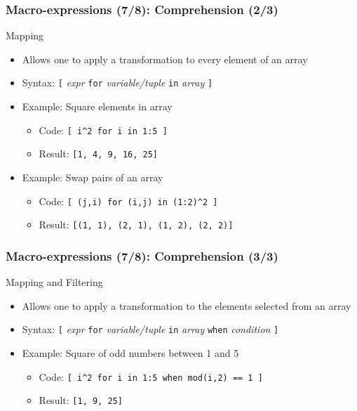 \documentclass[aspectratio=169]{beamer}
\begin{document}
\begin{frame}[fragile=singleslide]
  \frametitle{Macro-expressions (7/8): Comprehension (2/3)}
  \begin{block}{Mapping}
    \begin{itemize}
    \item Allows one to apply a transformation to every element of an array
    \item Syntax: \texttt{[} \textit{expr} \texttt{for} \textit{variable/tuple}
      \texttt{in} \textit{array} \texttt{]}
    \item Example: Square elements in array
      \begin{itemize}
      \item Code: \texttt{[ i\^{}2 for i in 1:5 ]}
      \item Result: \texttt{[1, 4, 9, 16, 25]}
      \end{itemize}
    \item Example: Swap pairs of an array
      \begin{itemize}
      \item Code: \texttt{[ (j,i) for (i,j) in (1:2)\^{}2 ]}
      \item Result: \texttt{[(1, 1), (2, 1), (1, 2), (2, 2)]}
      \end{itemize}
    \end{itemize}
  \end{block}
\end{frame}

\begin{frame}[fragile=singleslide]
  \frametitle{Macro-expressions (7/8): Comprehension (3/3)}
  \begin{block}{Mapping and Filtering}
    \begin{itemize}
    \item Allows one to apply a transformation to the elements selected from an array
    \item Syntax: \texttt{[} \textit{expr} \texttt{for} \textit{variable/tuple}
      \texttt{in} \textit{array} \texttt{when} \textit{condition} \texttt{]}
    \item Example: Square of odd numbers between 1 and 5
      \begin{itemize}
      \item Code: \texttt{[ i\^{}2 for i in 1:5 when mod(i,2) == 1 ]}
      \item Result: \texttt{[1, 9, 25]}
      \end{itemize}
    \end{itemize}
  \end{block}
\end{frame}
\end{document}
